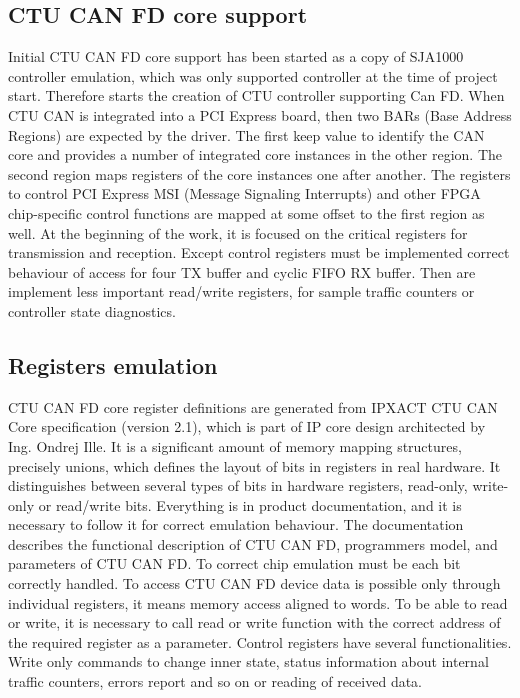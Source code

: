 \documentclass{ctuthesis}
\begin{document}
 \subsection{CTU CAN FD core support}
  Initial CTU CAN FD core support has been started as a copy of SJA1000 controller emulation, which was only supported controller at the time of project start. Therefore starts the creation of CTU controller supporting Can FD.
  When CTU CAN is integrated into a PCI Express board, then two BARs (Base Address Regions) are expected by the driver. The first keep value to identify the CAN core and provides a number of integrated core instances in the other region. The second region maps registers of the core instances one after another. The registers to control PCI Express MSI (Message Signaling Interrupts) and other FPGA chip-specific control functions are mapped at some offset to the first region as well. At the beginning of the work, it is focused on the critical registers for transmission and reception. Except control registers must be implemented correct behaviour of access for four TX buffer and cyclic FIFO RX buffer. Then are implement less important read/write registers, for sample traffic counters or controller state diagnostics.
 
 \subsection{Registers emulation}
  CTU CAN FD core register definitions are generated from IPXACT CTU CAN Core specification (version 2.1), which is part of IP core design architected by Ing. Ondrej Ille. It is a significant amount of memory mapping structures, precisely unions, which defines the layout of bits in registers in real hardware. It distinguishes between several types of bits in hardware registers, read-only, write-only or read/write bits. Everything is in product documentation, and it is necessary to follow it for correct emulation behaviour. The documentation describes the functional description of CTU CAN FD, programmers model, and parameters of CTU CAN FD. To correct chip emulation must be each bit correctly handled. To access CTU CAN FD device data is possible only through individual registers, it means memory access aligned to words. To be able to read or write, it is necessary to call read or write function with the correct address of the required register as a parameter.
  Control registers have several functionalities. Write only commands to change inner state, status information about internal traffic counters, errors report and so on or reading of received data.
 
\end{document}
